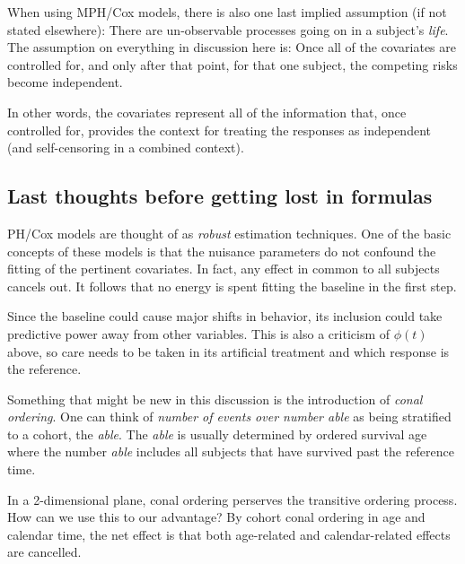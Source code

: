 \documentclass[10pt]{article}
\begin{document}
When using MPH/Cox models, there is also one last implied assumption (if not stated elsewhere):  There are un-observable processes going
on in a subject's {\em life}.  The assumption on everything in discussion here is:  Once all of the covariates are controlled for, and
only after that point,
for that one subject, the competing risks become independent.  

In other words, the covariates represent all of the information that, once controlled for, provides the context for treating 
the responses as independent (and self-censoring in a combined context).

\subsection{Last thoughts before getting lost in formulas}

PH/Cox models are thought of as {\em robust} estimation techniques.
One of the basic concepts of these models is that the nuisance parameters do not confound the fitting of the pertinent covariates.  
In fact, any effect in common to all subjects cancels out.  It follows that 
no energy is spent fitting the baseline in the first step.  

Since the baseline could cause major shifts in behavior, its inclusion could take predictive power away from other variables.  
This is also a criticism of $\phi(t)$ above, so care needs to be taken in its artificial treatment and which response is the reference.

Something that might be new in this discussion is the introduction of {\em conal ordering}.
One can think of {\em number of events over number able} as being stratified to a cohort, the {\em able}.   
The {\em able} is usually determined by ordered survival age where the number {\em able} includes all subjects that have survived past the
reference time.

In a 2-dimensional plane, conal ordering perserves the
transitive ordering process.  How can we use this to our advantage?  By cohort conal ordering in age and calendar time,
        the net effect is that both age-related and calendar-related effects are cancelled.  
\end{document}
